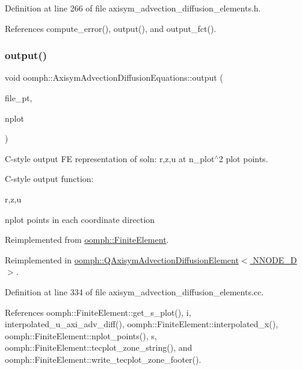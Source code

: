Definition at line 266 of file axisym\+\_\+advection\+\_\+diffusion\+\_\+elements.\+h.



References compute\+\_\+error(), output(), and output\+\_\+fct().

\mbox{\label{classoomph_1_1AxisymAdvectionDiffusionEquations_ae8f5071aa83c8b71e3d455ae56a25214}} 
\subsubsection{\texorpdfstring{output()}{output()}\hspace{0.1cm}{\footnotesize\ttfamily [4/4]}}
{\footnotesize\ttfamily void oomph\+::\+Axisym\+Advection\+Diffusion\+Equations\+::output (\begin{DoxyParamCaption}\item[{F\+I\+LE $\ast$}]{file\+\_\+pt,  }\item[{const unsigned \&}]{nplot }\end{DoxyParamCaption})\hspace{0.3cm}{\ttfamily [virtual]}}



C-\/style output FE representation of soln\+: r,z,u at n\+\_\+plot$^\wedge$2 plot points. 

C-\/style output function\+:

r,z,u

nplot points in each coordinate direction 

Reimplemented from \hyperlink{classoomph_1_1FiniteElement_adfaee690bb0608f03320eeb9d110d48c}{oomph\+::\+Finite\+Element}.



Reimplemented in \hyperlink{classoomph_1_1QAxisymAdvectionDiffusionElement_a636e99ae2ec6ac0c5e691acb89c3f5ef}{oomph\+::\+Q\+Axisym\+Advection\+Diffusion\+Element$<$ N\+N\+O\+D\+E\+\_\+D $>$}.



Definition at line 334 of file axisym\+\_\+advection\+\_\+diffusion\+\_\+elements.\+cc.



References oomph\+::\+Finite\+Element\+::get\+\_\+s\+\_\+plot(), i, interpolated\+\_\+u\+\_\+axi\+\_\+adv\+\_\+diff(), oomph\+::\+Finite\+Element\+::interpolated\+\_\+x(), oomph\+::\+Finite\+Element\+::nplot\+\_\+points(), s, oomph\+::\+Finite\+Element\+::tecplot\+\_\+zone\+\_\+string(), and oomph\+::\+Finite\+Element\+::write\+\_\+tecplot\+\_\+zone\+\_\+footer().

